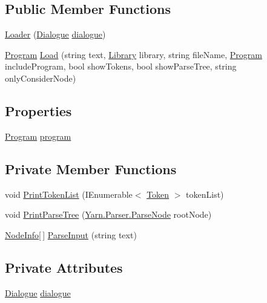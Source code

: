 \subsection*{Public Member Functions}
\begin{DoxyCompactItemize}
\item 
\hyperlink{a00065_a1972fc413e1679ecbe91eef536ca8479}{Loader} (\hyperlink{a00050}{Dialogue} \hyperlink{a00065_a89d1f29eba1c52c96c62a4cfe7859a1d}{dialogue})
\item 
\hyperlink{a00081}{Program} \hyperlink{a00065_ab6044e0d99dd4e6961ae7daaf1532c99}{Load} (string text, \hyperlink{a00063}{Library} library, string file\-Name, \hyperlink{a00081}{Program} include\-Program, bool show\-Tokens, bool show\-Parse\-Tree, string only\-Consider\-Node)
\end{DoxyCompactItemize}
\subsection*{Properties}
\begin{DoxyCompactItemize}
\item 
\hyperlink{a00081}{Program} \hyperlink{a00065_a6d8296076823c0c082df9024367f4860}{program}
\end{DoxyCompactItemize}
\subsection*{Private Member Functions}
\begin{DoxyCompactItemize}
\item 
void \hyperlink{a00065_a9321fce224021841ce6f70ca7fbe531b}{Print\-Token\-List} (I\-Enumerable$<$ \hyperlink{a00093}{Token} $>$ token\-List)
\item 
void \hyperlink{a00065_aa105ea8e5d65a420d1089616523feecc}{Print\-Parse\-Tree} (\hyperlink{a00077}{Yarn.\-Parser.\-Parse\-Node} root\-Node)
\item 
\hyperlink{a00070}{Node\-Info}\mbox{[}$\,$\mbox{]} \hyperlink{a00065_a2f635405d2b624ac67a27da0787a3524}{Parse\-Input} (string text)
\end{DoxyCompactItemize}
\subsection*{Private Attributes}
\begin{DoxyCompactItemize}
\item 
\hyperlink{a00050}{Dialogue} \hyperlink{a00065_a89d1f29eba1c52c96c62a4cfe7859a1d}{dialogue}
\end{DoxyCompactItemize}


